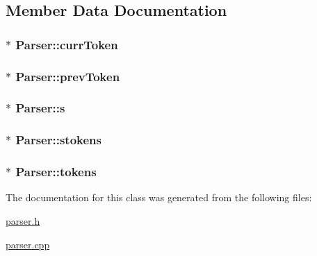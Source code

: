 \subsection{Member Data Documentation}
\hypertarget{classParser_a75ab2e2b9385c14e5f967f873340ed11}{
\subsubsection[{curr\-Token}]{$\ast$ Parser\-::curr\-Token}}\label{classParser_a75ab2e2b9385c14e5f967f873340ed11}
\hypertarget{classParser_a4bcf7560a5ea1b486bbe4bb54a5a22eb}{
\subsubsection[{prev\-Token}]{$\ast$ Parser\-::prev\-Token}}\label{classParser_a4bcf7560a5ea1b486bbe4bb54a5a22eb}
\hypertarget{classParser_ab2ef99ea9e732f5fd176b3949a6c32af}{
\subsubsection[{s}]{$\ast$ Parser\-::s}}\label{classParser_ab2ef99ea9e732f5fd176b3949a6c32af}
\hypertarget{classParser_a0910de176dcc1cdfbf7ad99622ce9dd5}{
\subsubsection[{stokens}]{$\ast$ Parser\-::stokens}}\label{classParser_a0910de176dcc1cdfbf7ad99622ce9dd5}
\hypertarget{classParser_a3606ff327be18af7f76df95f50851633}{
\subsubsection[{tokens}]{$\ast$ Parser\-::tokens}}\label{classParser_a3606ff327be18af7f76df95f50851633}


The documentation for this class was generated from the following files\-:\begin{DoxyCompactItemize}
\item 
\hyperlink{parser_8h}{parser.\-h}\item 
\hyperlink{parser_8cpp}{parser.\-cpp}\end{DoxyCompactItemize}
